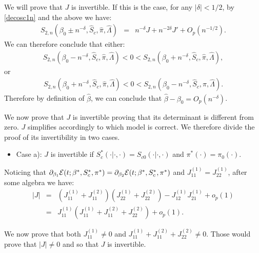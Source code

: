\documentclass[11pt]{article}
\newcommand{\eqnn}{\begin{eqnarray*}}
\newcommand{\een}{\end{eqnarray*}}
\begin{document}
We will prove that $J$ is invertible. If this is the case, for any $|\delta|<1/2$, by \eqref{decosc1n}  and the above we have:
\eqnn
S_{2,n}(\beta_0\pm n^{-\delta}, \hat S_c,  \hat \pi, \hat \Lambda)&=&n^{-\delta}J+n^{-2\delta}J'+O_p(n^{-1/2}).
\een
We can therefore conclude that either:
\eqnn
S_{2,n}(\beta_0- n^{-\delta}, \hat S_c,  \hat \pi, \hat \Lambda)<{0}<S_{2,n}(\beta_0+n^{-\delta}, \hat S_c,  \hat \pi, \hat \Lambda),
\een
or
\eqnn
S_{2,n}(\beta_0+ n^{-\delta}, \hat S_c,  \hat \pi, \hat \Lambda)<{0}<S_{2,n}(\beta_0-n^{-\delta}, \hat S_c,  \hat \pi, \hat \Lambda).
\een
Therefore by definition of $\hat{{\beta}}$, we can conclude that $\hat{{\beta}}-{\beta}_0=O_p(n^{-\delta})$.

We now prove that $J$ is invertible proving that its determinant is different from zero.
$J$ simplifies accordingly to which model is correct. We therefore divide the proof of its invertibility in two cases.

\begin{itemize}
\item{Case a): $J$ is invertible if $S^{*}_c(\cdot | \cdot,\cdot)=S_{c0}(\cdot | \cdot,\cdot)$ and $\pi^{*}(\cdot)=\pi_0(\cdot)$.}
\end{itemize} 
Noticing that $ \partial_{\beta_1}{\cal E}(t; {\beta}^{*}, S^{*}_c,\pi^{*})= \partial_{\beta_2}{\cal E}(t; {\beta}^{*}, S^{*}_c,\pi^{*})$ and $J^{(1)}_{11}=J^{(1)}_{22}$, after some algebra we have:
\eqnn
|J|&=&(J^{(1)}_{11}+J^{(2)}_{11})(J^{(1)}_{22}+J^{(2)}_{22})-J^{(1)}_{12}J^{(1)}_{21}+o_p(1)\\
&=&J^{(1)}_{11}(J^{(1)}_{11}+J^{(2)}_{11}+J^{(2)}_{22})+o_p(1).
\een

We now prove that both $J^{(1)}_{11}\neq 0$ and $J^{(1)}_{11}+J^{(2)}_{11}+J^{(2)}_{22} \neq 0$. Those would prove that $|J|\neq 0$ and so that $J$ is invertible.
\end{document}
